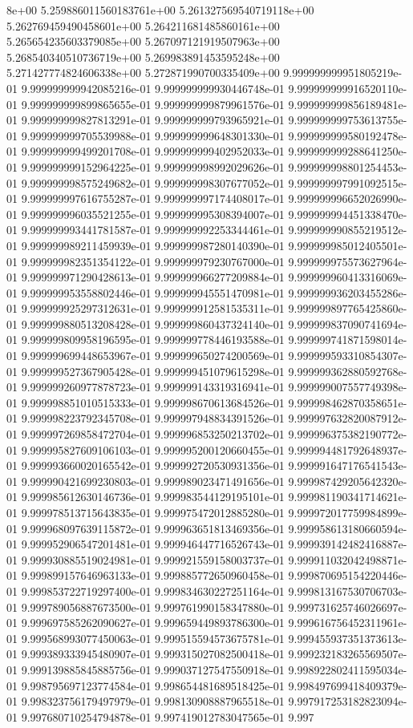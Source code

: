 8e+00	5.259886011560183761e+00	5.261327569540719118e+00	5.262769459490458601e+00	5.264211681485860161e+00	5.265654235603379085e+00	5.267097121919507963e+00	5.268540340510736719e+00	5.269983891453595248e+00	5.271427774824606338e+00	5.272871990700335409e+00
9.999999999951805219e-01	9.999999999942085216e-01	9.999999999930446748e-01	9.999999999916520110e-01	9.999999999899865655e-01	9.999999999879961576e-01	9.999999999856189481e-01	9.999999999827813291e-01	9.999999999793965921e-01	9.999999999753613755e-01	9.999999999705539988e-01	9.999999999648301330e-01	9.999999999580192478e-01	9.999999999499201708e-01	9.999999999402952033e-01	9.999999999288641250e-01	9.999999999152964225e-01	9.999999998992029626e-01	9.999999998801254453e-01	9.999999998575249682e-01	9.999999998307677052e-01	9.999999997991092515e-01	9.999999997616755287e-01	9.999999997174408017e-01	9.999999996652026990e-01	9.999999996035521255e-01	9.999999995308394007e-01	9.999999994451338470e-01	9.999999993441781587e-01	9.999999992253344461e-01	9.999999990855219512e-01	9.999999989211459939e-01	9.999999987280140390e-01	9.999999985012405501e-01	9.999999982351354122e-01	9.999999979230767000e-01	9.999999975573627964e-01	9.999999971290428613e-01	9.999999966277209884e-01	9.999999960413316069e-01	9.999999953558802446e-01	9.999999945551470981e-01	9.999999936203455286e-01	9.999999925297312631e-01	9.999999912581535311e-01	9.999999897765425860e-01	9.999999880513208428e-01	9.999999860437324140e-01	9.999999837090741694e-01	9.999999809958196595e-01	9.999999778446193588e-01	9.999999741871598014e-01	9.999999699448653967e-01	9.999999650274200569e-01	9.999999593310854307e-01	9.999999527367905428e-01	9.999999451079615298e-01	9.999999362880592768e-01	9.999999260977878723e-01	9.999999143319316941e-01	9.999999007557749398e-01	9.999998851010515333e-01	9.999998670613684526e-01	9.999998462870358651e-01	9.999998223792345708e-01	9.999997948834391526e-01	9.999997632820087912e-01	9.999997269858472704e-01	9.999996853250213702e-01	9.999996375382190772e-01	9.999995827609106103e-01	9.999995200120660455e-01	9.999994481792648937e-01	9.999993660020165542e-01	9.999992720530931356e-01	9.999991647176541543e-01	9.999990421699230803e-01	9.999989023471491656e-01	9.999987429205642320e-01	9.999985612630146736e-01	9.999983544129195101e-01	9.999981190341714621e-01	9.999978513715643835e-01	9.999975472012885280e-01	9.999972017759984899e-01	9.999968097639115872e-01	9.999963651813469356e-01	9.999958613180660594e-01	9.999952906547201481e-01	9.999946447716526743e-01	9.999939142482416887e-01	9.999930885519024981e-01	9.999921559158003737e-01	9.999911032042498871e-01	9.999899157646963133e-01	9.999885772650960458e-01	9.999870695154220446e-01	9.999853722719297400e-01	9.999834630227251164e-01	9.999813167530706703e-01	9.999789056887673500e-01	9.999761990158347880e-01	9.999731625746026697e-01	9.999697585262090627e-01	9.999659449893786300e-01	9.999616756452311961e-01	9.999568993077450063e-01	9.999515594573675781e-01	9.999455937351373613e-01	9.999389333945480907e-01	9.999315027082500418e-01	9.999232183265569507e-01	9.999139885845885756e-01	9.999037127547550918e-01	9.998922802411595034e-01	9.998795697123774584e-01	9.998654481689518425e-01	9.998497699418409379e-01	9.998323756179497979e-01	9.998130908887965518e-01	9.997917253182823094e-01	9.997680710254794878e-01	9.997419012783047565e-01	9.997